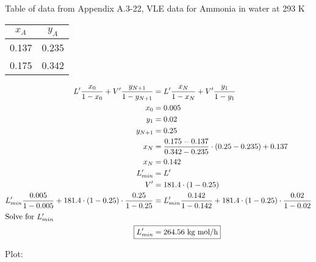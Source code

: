 \documentclass[12pt]{article}
\begin{document}
\begin{enumerate}
    Table of data from Appendix A.3-22, VLE data for Ammonia in water at 293 K
    
    \begin{tabular}{|c|c|}
        \hline
        $x_A$ & $y_A$ \\
        \hline
        0.137 & 0.235 \\
        0.175 & 0.342 \\
        \hline
    \end{tabular}

    \begin{align*}
        L' \frac{x_0}{1 - x_0} + V' \frac{y_{N+1}}{1 - y_{N+1}} &= L' \frac{x_N}{1 - x_N} + V' \frac{y_{1}}{1 - y_{1}} \\
        x_0 &= 0.005 \\
        y_1 &= 0.02 \\
        y_{N+1} &= 0.25 \\
        x_N &= \frac{0.175 - 0.137}{0.342 - 0.235} \cdot (0.25 - 0.235) + 0.137 \\
        x_N &= 0.142 \\
        L_{min}' &= L' \\
        V' &= 181.4 \cdot (1 - 0.25) \\
        L_{min}' \frac{0.005}{1 - 0.005} + 181.4 \cdot (1 - 0.25) \cdot \frac{0.25}{1 - 0.25} &= L_{min}' \frac{0.142}{1 - 0.142} + 181.4 \cdot (1 - 0.25) \cdot \frac{0.02}{1 - 0.02} \\
        \intertext{Solve for $L_{min}'$}
        \Aboxed{L_{min}' &= 264.56 \text{ kg mol/h}}
    \end{align*}

    Plot:

    


\end{enumerate}
\end{document}
